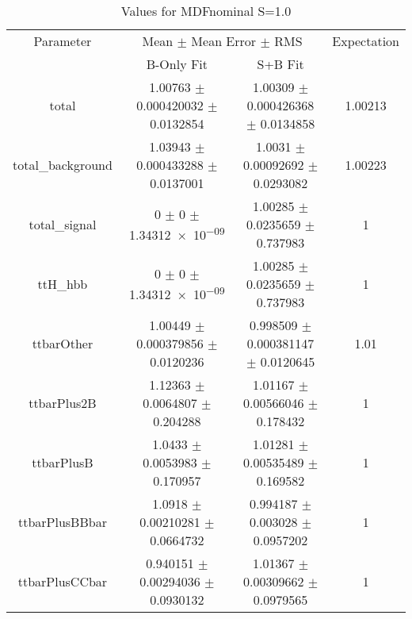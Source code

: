 \begin{table}
\centering
\caption{Values for MDFnominal S=1.0}
\begin{tabular}{cccc}
\toprule
Parameter & \multicolumn{2}{c}{Mean $\pm$ Mean Error $\pm$ RMS} & Expectation\\
 & B-Only Fit & S+B Fit & \\
\midrule
total & \num{1.00763} $\pm$ \num{0.000420032} $\pm$ \num{0.0132854} & \num{1.00309} $\pm$ \num{0.000426368} $\pm$ \num{0.0134858} & \num{1.00213}\\
total\_background & \num{1.03943} $\pm$ \num{0.000433288} $\pm$ \num{0.0137001} & \num{1.0031} $\pm$ \num{0.00092692} $\pm$ \num{0.0293082} & \num{1.00223}\\
total\_signal & \num{0} $\pm$ \num{0} $\pm$ \num{1.34312e-09} & \num{1.00285} $\pm$ \num{0.0235659} $\pm$ \num{0.737983} & \num{1}\\
ttH\_hbb & \num{0} $\pm$ \num{0} $\pm$ \num{1.34312e-09} & \num{1.00285} $\pm$ \num{0.0235659} $\pm$ \num{0.737983} & \num{1}\\
ttbarOther & \num{1.00449} $\pm$ \num{0.000379856} $\pm$ \num{0.0120236} & \num{0.998509} $\pm$ \num{0.000381147} $\pm$ \num{0.0120645} & \num{1.01}\\
ttbarPlus2B & \num{1.12363} $\pm$ \num{0.0064807} $\pm$ \num{0.204288} & \num{1.01167} $\pm$ \num{0.00566046} $\pm$ \num{0.178432} & \num{1}\\
ttbarPlusB & \num{1.0433} $\pm$ \num{0.0053983} $\pm$ \num{0.170957} & \num{1.01281} $\pm$ \num{0.00535489} $\pm$ \num{0.169582} & \num{1}\\
ttbarPlusBBbar & \num{1.0918} $\pm$ \num{0.00210281} $\pm$ \num{0.0664732} & \num{0.994187} $\pm$ \num{0.003028} $\pm$ \num{0.0957202} & \num{1}\\
ttbarPlusCCbar & \num{0.940151} $\pm$ \num{0.00294036} $\pm$ \num{0.0930132} & \num{1.01367} $\pm$ \num{0.00309662} $\pm$ \num{0.0979565} & \num{1}\\
\bottomrule
\end{tabular}
\end{table}